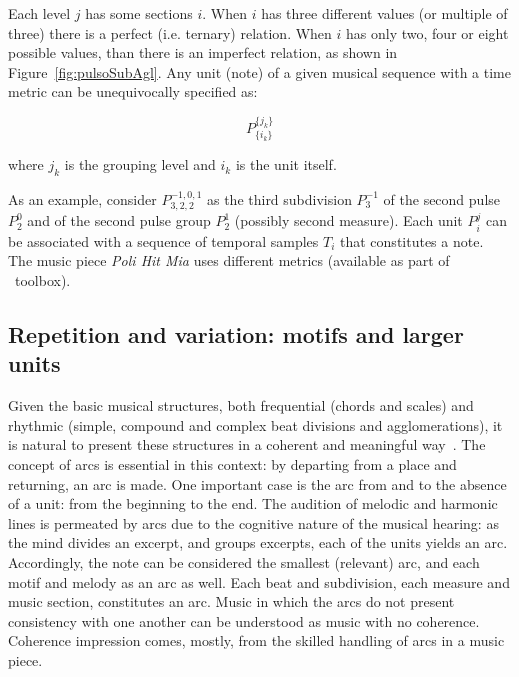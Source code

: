 Each level $j$ has some sections $i$. When $i$ has three different
values (or multiple of three) there is a perfect (i.e. ternary) relation. When $i$ has only
two, four or eight possible values, than there is an imperfect relation,
as shown in Figure~\ref{fig:pulsoSubAgl}. Any unit (note) of a given musical sequence with a time metric can be unequivocally
specified as:

\begin{equation}
P^{ \{ j_k \} }_{ \{ i_{k} \}}
\end{equation}

\noindent where $j_k$ is the grouping level and $i_k$ is the unit itself.

As an example, consider $P^{-1,0,1}_{3,2,2}$ as the third subdivision $P^{-1}_3$ of the
second pulse $P^0_2$ and of the second pulse group $P^1_2$ (possibly second measure). Each unit $P_i^j$ can be associated with a sequence of temporal samples $T_i$ that constitutes a
note. The music piece \emph{Poli Hit Mia} uses different metrics (available as part of \massa\ toolbox).

\subsection{Repetition and variation: motifs and larger units}\label{subsec:motivos}
Given the basic musical structures, both frequential (chords and scales) and rhythmic (simple, compound and complex beat divisions and agglomerations), it is
natural to present these structures in a coherent and meaningful way~\cite{Boulez}. The concept of arcs is essential in this context: by departing from a place and returning, an arc is made. One important case is the arc from and to the absence of a unit: from the beginning to the end. The audition of melodic and harmonic lines is permeated by
arcs due to the cognitive nature of the musical hearing: as the mind divides an excerpt, and groups excerpts, each of the units yields an arc.
Accordingly, the note can be considered the smallest (relevant) arc, and each motif and melody as an arc as well.
Each beat and subdivision, each measure and music
section, constitutes an arc. Music in which the arcs do not present consistency with one another can be understood as music with no coherence. Coherence impression
comes, mostly, from the skilled handling of arcs in a music piece.

